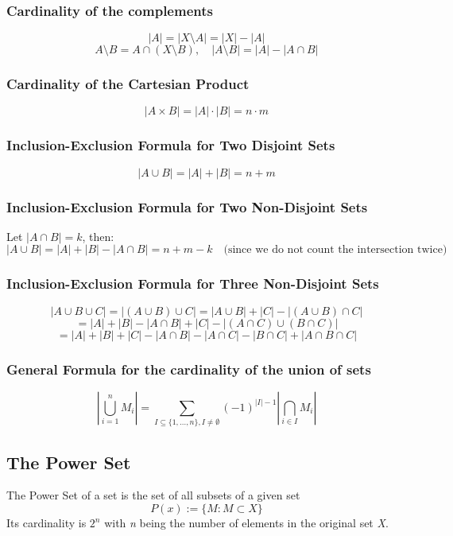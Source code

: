 \subsubsection{Cardinality of the complements}
\[
	|A| = |X \setminus A| = |X| - |A|
\]
\[
	A \setminus B = A \cap (X \setminus B), \quad |A \setminus B| = |A| - |A \cap B|
\]

\subsubsection{Cardinality of the Cartesian Product}
\[
	|A \times B| = |A| \cdot |B| = n \cdot m
\]

\subsubsection{Inclusion-Exclusion Formula for Two Disjoint Sets}
\[
	|A \cup B| = |A| + |B| = n + m
\]

\subsubsection{Inclusion-Exclusion Formula for Two Non-Disjoint Sets}
Let \( |A \cap B| = k \), then:
\[
	|A \cup B| = |A| + |B| - |A \cap B| = n + m - k \quad \text{(since we do not count the intersection twice)}
\]

\subsubsection{Inclusion-Exclusion Formula for Three Non-Disjoint Sets}
\[
	|A \cup B \cup C| = |(A \cup B) \cup C| = |A \cup B| + |C| - |(A \cup B) \cap C|
\]
\[
	= |A| + |B| - |A \cap B| + |C| - |(A \cap C) \cup (B \cap C)|
\]
\[
	= |A| + |B| + |C| - |A \cap B| - |A \cap C| - |B \cap C| + |A \cap B \cap C|
\]

\subsubsection{General Formula for the cardinality of the union of sets}

\[
	\left\vert \bigcup_{i = 1}^n M_i \right\vert  = \sum_{I \subseteq \{1, \dots, n\}, I \neq \emptyset}{(-1)}^{|I| - 1} \left\vert \bigcap_{i \in I} M_i \right\vert
\]

\subsection{The Power Set}
The Power Set of a set is the set of all subsets of a given set \[
	P(x):= \{ M: M \subset X\}
\]
Its cardinality is \(2^n\) with \emph{n} being the number of elements in the original set \textit{X}.

